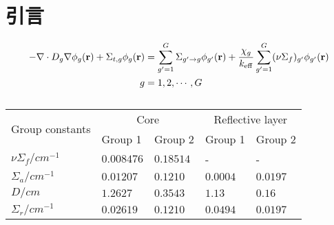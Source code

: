 \section{引言}

\begin{align}
    -\nabla\cdot D_g\nabla\phi_g(\vectorbold{r}) + \Sigma_{t,g}\phi_g(\vectorbold{r}) &= \sum_{g'=1}^G\Sigma_{g'\rightarrow g}\phi_{g'}(\vectorbold{r}) + \frac{\chi_g}{k_\mathrm{eff}}\sum_{g'=1}^G(\nu\Sigma_f)_{g'}\phi_{g'}(\vectorbold{r}) \\
    g &= 1,2,\cdots,G
\end{align}

\begin{table}[H]
    \centering
    \caption{}
    \label{tab:}
    \begin{tabular}{lllll}    \toprule
    \multirow{2}{*}{Group constants} & \multicolumn{2}{c}{Core} & \multicolumn{2}{c}{Reflective layer} \\
    \cmidrule(lr){2-3}\cmidrule(lr){4-5}
     & Group 1 & Group 2 & Group 1 & Group 2 \\
    \midrule
    $\nu\Sigma_f/\si{cm^{-1}}$ & $0.008476$ & $0.18514$ & - & - \\
    $\Sigma_a/\si{cm^{-1}}$ & $0.01207$ & $0.1210$ & $0.0004$ & $0.0197$ \\
    $D/\si{cm}$ & $1.2627$ & $0.3543$ & $1.13$ & $0.16$ \\
    $\Sigma_r/\si{cm^{-1}}$ & $0.02619$ & $0.1210$ & $0.0494$ & $0.0197$ \\
    \bottomrule
    \end{tabular}
\end{table}
